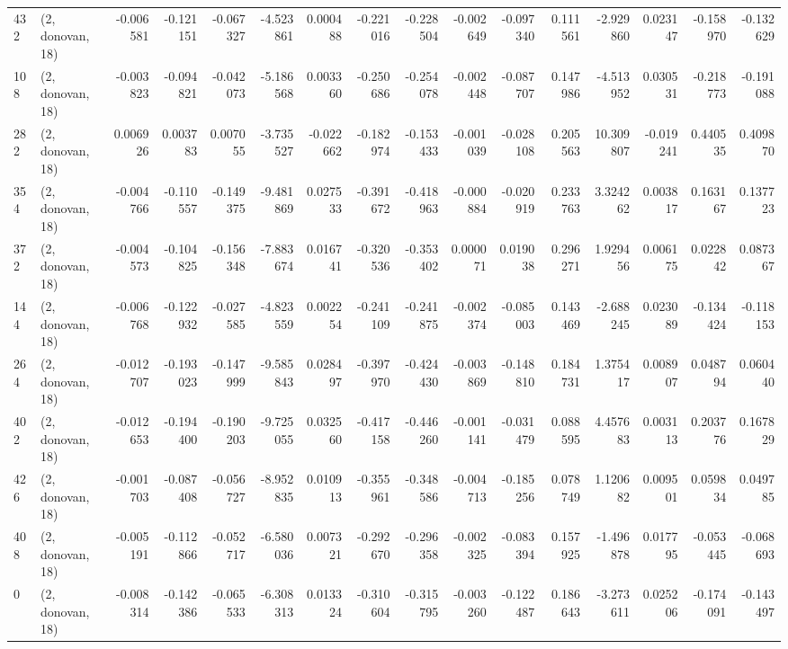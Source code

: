 \begin{tabular}{llrrrrrrrrrrrrrr}
432 &  (2, donovan, 18) &  -0.006581 & -0.121151 & -0.067327 &  -4.523861 &  0.000488 &  -0.221016 & -0.228504 & -0.002649 & -0.097340 &  0.111561 &    -2.929860 &   0.023147 &  -0.158970 &  -0.132629 \\
108 &  (2, donovan, 18) &  -0.003823 & -0.094821 & -0.042073 &  -5.186568 &  0.003360 &  -0.250686 & -0.254078 & -0.002448 & -0.087707 &  0.147986 &    -4.513952 &   0.030531 &  -0.218773 &  -0.191088 \\
282 &  (2, donovan, 18) &   0.006926 &  0.003783 &  0.007055 &  -3.735527 & -0.022662 &  -0.182974 & -0.153433 & -0.001039 & -0.028108 &  0.205563 &    10.309807 &  -0.019241 &   0.440535 &   0.409870 \\
354 &  (2, donovan, 18) &  -0.004766 & -0.110557 & -0.149375 &  -9.481869 &  0.027533 &  -0.391672 & -0.418963 & -0.000884 & -0.020919 &  0.233763 &     3.324262 &   0.003817 &   0.163167 &   0.137723 \\
372 &  (2, donovan, 18) &  -0.004573 & -0.104825 & -0.156348 &  -7.883674 &  0.016741 &  -0.320536 & -0.353402 &  0.000071 &  0.019038 &  0.296271 &     1.929456 &   0.006175 &   0.022842 &   0.087367 \\
144 &  (2, donovan, 18) &  -0.006768 & -0.122932 & -0.027585 &  -4.823559 &  0.002254 &  -0.241109 & -0.241875 & -0.002374 & -0.085003 &  0.143469 &    -2.688245 &   0.023089 &  -0.134424 &  -0.118153 \\
264 &  (2, donovan, 18) &  -0.012707 & -0.193023 & -0.147999 &  -9.585843 &  0.028497 &  -0.397970 & -0.424430 & -0.003869 & -0.148810 &  0.184731 &     1.375417 &   0.008907 &   0.048794 &   0.060440 \\
402 &  (2, donovan, 18) &  -0.012653 & -0.194400 & -0.190203 &  -9.725055 &  0.032560 &  -0.417158 & -0.446260 & -0.001141 & -0.031479 &  0.088595 &     4.457683 &   0.003113 &   0.203776 &   0.167829 \\
426 &  (2, donovan, 18) &  -0.001703 & -0.087408 & -0.056727 &  -8.952835 &  0.010913 &  -0.355961 & -0.348586 & -0.004713 & -0.185256 &  0.078749 &     1.120682 &   0.009501 &   0.059834 &   0.049785 \\
408 &  (2, donovan, 18) &  -0.005191 & -0.112866 & -0.052717 &  -6.580036 &  0.007321 &  -0.292670 & -0.296358 & -0.002325 & -0.083394 &  0.157925 &    -1.496878 &   0.017795 &  -0.053445 &  -0.068693 \\
0   &  (2, donovan, 18) &  -0.008314 & -0.142386 & -0.065533 &  -6.308313 &  0.013324 &  -0.310604 & -0.315795 & -0.003260 & -0.122487 &  0.186643 &    -3.273611 &   0.025206 &  -0.174091 &  -0.143497 \\

\end{tabular}
